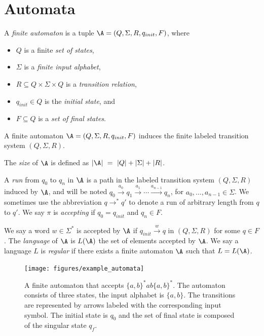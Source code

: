 \section{Automata}


\begin{samepage}
A {\em finite automaton}  is a tuple
$\A=(Q,\Sigma,R,q_{init},F)$, where
\begin{itemize}
	\item $Q$ is a finite {\em set of  states}, 
	\item $\Sigma$ is a {\em finite input alphabet},
	\item $R\subseteq Q\times \Sigma \times Q$
	is a %
		{\em transition relation},
	\item $q_{init}\in Q$ is the {\em initial  state}, and 
	\item $F\subseteq Q$ is a {\em set of final  states}. \newline
\end{itemize}
\end{samepage}

\noindent
A finite automaton $\A=(Q,\Sigma,R,q_{init},F)$
 induces the finite labeled transition system $(Q, \Sigma, R)$.

The {\em size} of $\A$ is defined as $|\A| \ = \ |Q|+|\Sigma|+|R|$.

A {\em run} from $q_0$ to $q_n$ in $\A$ is a 
path in the labeled transition system $(Q, \Sigma, R)$ induced by $\A$,
and will be noted
$q_0 \xrightarrow{a_0} q_1 \xrightarrow{a_1} \cdots \xrightarrow{a_{n-1}} q_n$,
for $a_0, \ldots, a_{n-1} \in \Sigma$.
We sometimes use the abbreviation $q \rightarrow^* q'$
to denote a run of arbitrary length from $q$ to $q'$.
We say $\pi$ is {\em accepting} if
 $q_0 = q_{init}$
 and $q_n \in F$.

We say a word $w \in \Sigma^*$ is accepted by $\A$ if 
$q_{init} \xrightarrow{w} q$ in $(Q, \Sigma, R)$
for some $q \in F$. %
%
The {\em language} of $\A$ is $L(\A)$ the
set of elements accepted by $\A$.
We say a language $L$ is {\em regular} if there exists a finite automaton $\A$
such that $L= L(\A)$.

\begin{center}
	\begin{figure}
			\hspace{3.81cm}
\texttt{[image: figures/example\_automata]}
	\caption{A finite automaton that accepts $\{a,b\}^*ab\{a,b\}^* $. The automaton consists of three states, the input alphabet is $\{a,b\}$. The transitions are represented by arrows labeled with the corresponding input symbol. The initial state is $q_0$ and the set of final state is composed of the singular  state $q_f$.}
	\label{example_automata}
	\end{figure}
\end{center}

